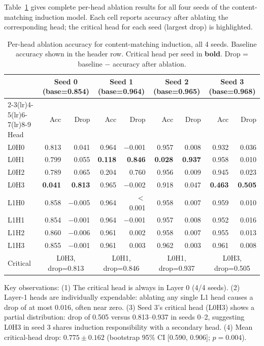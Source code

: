 Table~\ref{tab:per_seed_full} gives complete per-head ablation results for all four seeds
of the content-matching induction model. Each cell reports accuracy after ablating the
corresponding head; the critical head for each seed (largest drop) is highlighted.

\begin{table}[h]
\centering
\caption{Per-head ablation accuracy for content-matching induction, all 4 seeds.
Baseline accuracy shown in the header row. Critical head per seed in \textbf{bold}.
Drop = baseline $-$ accuracy after ablation.}
\label{tab:per_seed_full}
\small
\begin{tabular}{lrrrrrrrr}
\toprule
 & \multicolumn{2}{c}{Seed 0 (base=0.854)} & \multicolumn{2}{c}{Seed 1 (base=0.964)} &
   \multicolumn{2}{c}{Seed 2 (base=0.965)} & \multicolumn{2}{c}{Seed 3 (base=0.968)} \\
\cmidrule(lr){2-3}\cmidrule(lr){4-5}\cmidrule(lr){6-7}\cmidrule(lr){8-9}
Head & Acc & Drop & Acc & Drop & Acc & Drop & Acc & Drop \\
\midrule
L0H0 & 0.813 & 0.041 & 0.964 & $-$0.001 & 0.957 & 0.008 & 0.932 & 0.036 \\
L0H1 & 0.799 & 0.055 & \textbf{0.118} & \textbf{0.846} & \textbf{0.028} & \textbf{0.937} & 0.958 & 0.010 \\
L0H2 & 0.789 & 0.065 & 0.204 & 0.760 & 0.956 & 0.009 & 0.945 & 0.023 \\
L0H3 & \textbf{0.041} & \textbf{0.813} & 0.965 & $-$0.002 & 0.918 & 0.047 & \textbf{0.463} & \textbf{0.505} \\
L1H0 & 0.858 & $-$0.005 & 0.964 & $<$0.001 & 0.958 & 0.007 & 0.959 & 0.010 \\
L1H1 & 0.854 & $-$0.001 & 0.964 & $-$0.001 & 0.957 & 0.008 & 0.952 & 0.016 \\
L1H2 & 0.860 & $-$0.006 & 0.961 & 0.002 & 0.958 & 0.007 & 0.955 & 0.013 \\
L1H3 & 0.855 & $-$0.001 & 0.961 & 0.003 & 0.962 & 0.003 & 0.961 & 0.008 \\
\midrule
Critical & \multicolumn{2}{c}{L0H3, drop=0.813} & \multicolumn{2}{c}{L0H1, drop=0.846} &
           \multicolumn{2}{c}{L0H1, drop=0.937} & \multicolumn{2}{c}{L0H3, drop=0.505} \\
\bottomrule
\end{tabular}
\end{table}

\noindent Key observations: (1) The critical head is always in Layer 0 (4/4 seeds). (2) Layer-1
heads are individually expendable: ablating any single L1 head causes a drop of at most 0.016,
often near zero. (3) Seed 3's critical head (L0H3) shows a partial distribution: drop of 0.505
versus 0.813--0.937 in seeds 0--2, suggesting L0H3 in seed 3 shares induction responsibility
with a secondary head. (4) Mean critical-head drop: $0.775 \pm 0.162$ (bootstrap 95\% CI
[0.590, 0.906]; $p = 0.004$).

